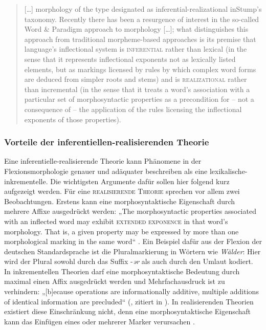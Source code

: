 \begin{quote}
[…] morphology of the type designated as inferential-realizational in\linebreak Stump’s taxonomy. Recently there has been a resurgence of interest in the so-called Word \& Paradigm approach to morphology […]; what distinguishes this approach from traditional morpheme-based approaches is its premise that language’s inflectional system is \textsc{inferential} rather than lexical (in the sense that it represents inflectional exponents not as lexically listed elements, but as markings licensed by rules by which complex word forms are deduced from simpler roots and stems) and is \textsc{realizational} rather than incremental (in the sense that it treats a word’s association with a particular set of morphosyntactic properties as a precondition for – not a consequence of – the application of the rules licensing the inflectional exponents of those properties). \citep[116]{AckermanStump2004}
\end{quote}

\subsubsection{Vorteile der inferentiellen-realisierenden Theorie} Eine in\-fe\-ren\-tiel\-le-re\-a\-li\-sie\-ren\-de Theorie kann Phänomene in der Flexionsmorphologie genauer und adäquater beschreiben als eine le\-xi\-ka\-li\-sche-in\-kre\-men\-telle. Die wichtigsten Argumente dafür sollen hier \citet{Stump2001} folgend kurz aufgezeigt werden. Für eine \textsc{realisierende Theorie} sprechen vor allem zwei Beobachtungen. Erstens kann eine morphosyntaktische Eigenschaft durch mehrere Affixe ausgedrückt werden: „The morphosyntactic properties associated with an inflected word may exhibit \textsc{extended exponence} in that word’s morphology. That is, a given property may be expressed by more than one morphological marking in the same word“ \citep[4]{Stump2001}. Ein Beispiel dafür aus der Flexion der deutschen Standardsprache ist die Pluralmarkierung in Wörtern wie \textit{Wälder}: Hier wird der Plural sowohl durch das Suffix -\textit{ər} als auch durch den Umlaut kodiert. In inkrementellen Theorien darf eine morphosyntaktische Bedeutung durch maximal einen Affix ausgedrückt werden und Mehrfachausdruck ist zu verhindern: „[b]ecause operations are informationally additive, multiple additions of identical information are precluded“ (\citealt[280]{Steele1995}, zitiert in \citealt[4]{Stump2001}). In realisierenden Theorien existiert diese Einschränkung nicht, denn eine morphosyntaktische Eigenschaft kann das Einfügen eines oder mehrerer Marker verursachen \citep[4]{Stump2001}.

